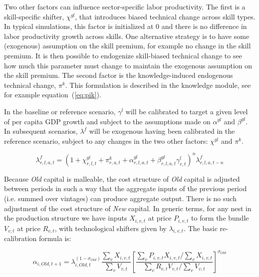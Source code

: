 \documentclass[11pt,letterpaper]{report}
\begin{document}
Two other factors can influence sector-specific labor productivity. The first is
a skill-specific shifter, $\chi^{\mathit{gl}}$, that introduces biased technical change across skill
types. In typical simulations, this factor is initialized at 0 and there is
no difference in labor productivity growth across skills. One alternative
strategy is to have some (exogenous) assumption on the skill premium, for example
no change in the skill premium. It is then possible to endogenize skill-biased
technical change to see how much this parameter must change to maintain the
exogenous assumption on the skill premium. The second factor is the
knowledge-induced endogenous technical change, $\pi^k$. This formulation
is described in the knowledge module, see for example equation~(\ref{eq:pik}).

In the baseline or reference
scenario, $\gamma^l$ will be calibrated to target a given level of per capita
GDP growth and subject to the assumptions made on $\alpha^{\mathit{gl}}$ and
$\beta^{\mathit{gl}}$. In subsequent scenarios, $\lambda^f$ will be exogenous
having been calibrated in the reference scenario, subject to any changes
in the two other factors: $\chi^{\mathit{gl}}$ and $\pi^k$.

\begin{equation}
\label{eq:lambdal}
\lambda^f_{r,l,a,t} =
   \left( 1 + \chi^{\mathit{gl}}_{r,l,t} + \pi^k_{r,a,t} + \alpha^{\mathit{gl}}_{r,l,a,t}
+  \beta^{\mathit{gl}}_{r,l,a,t} \gamma^l_{r,t} \right)^n \lambda^f_{r,l,a,t-n}
\end{equation}

Because \emph{Old} capital is malleable, the cost structure of \emph{Old} capital is
adjusted between periods in such a way that the aggregate inputs of the previous period (i.e.
summed over vintages) can produce aggregate output. There is no such adjustment of the
cost structure of \emph{New} capital. In generic terms, for any nest in the production structure
we have inputs $X_{i,v,t}$ at price $P_{i,v,t}$ to form the bundle $V_{v,t}$ at price $R_{v,t}$,
with technological shifters given by $\lambda_{i,v,t}$. The basic re-calibration formula is:

\[
\alpha_{i,\mathit{Old},t+1} =
\lambda_{i,\mathit{Old},t}^{\left(1-\sigma_{\mathit{Old}}\right)}
\frac{\displaystyle \sum_v{X_{i,v,t}}} {\displaystyle \sum_v{V_{v,t}}}
\left[
\frac{\displaystyle {\sum_v{P_{i,v,t} X_{i,v,t}}} \biggl / {\sum_v{X_{i,v,t}}}} {\displaystyle {\sum_v{R_{v,t} V_{v,t}}} \biggl / {\sum_v{V_{v,t}}}}
\right]^{\sigma_{\mathit{Old}}}
\]
\end{document}
